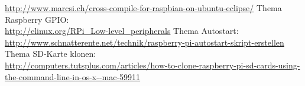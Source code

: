 \url{http://www.marcsi.ch/cross-compile-for-raspbian-on-ubuntu-eclipse/}
\newline
\newline
Thema Raspberry GPIO:\\
\url{http://elinux.org/RPi_Low-level_peripherals}
\newline
\newline
Thema Autostart:\\
\url{http://www.schnatterente.net/technik/raspberry-pi-autostart-skript-erstellen}
\newline
\newline
Thema SD-Karte klonen: \\
\url{http://computers.tutsplus.com/articles/how-to-clone-raspberry-pi-sd-cards-using-the-command-line-in-os-x--mac-59911}\\